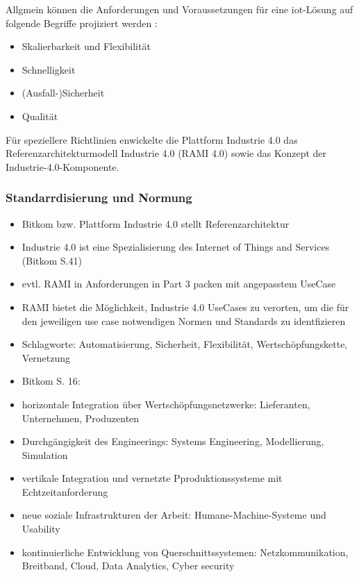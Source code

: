 Allgmein können die Anforderungen und Voraussetzungen für eine \ac{iot}-Lösung auf folgende Begriffe projiziert werden \citep{Acharya2019}:

\begin{itemize}
  \item Skalierbarkeit und Flexibilität
  \item Schnelligkeit
  \item (Ausfall-)Sicherheit
  \item Qualität
\end{itemize}

Für speziellere Richtlinien enwickelte die Plattform Industrie 4.0 das \glqq Referenzarchitekturmodell Industrie 4.0\grqq{} (RAMI 4.0) sowie das Konzept der \glqq Industrie-4.0-Komponente\grqq{}.

\subsubsection{Standarrdisierung und Normung}

\begin{itemize}
  \item Bitkom bzw. Plattform Industrie 4.0 stellt Referenzarchitektur
  \item Industrie 4.0 ist eine Spezialisierung des Internet of Things and Services (Bitkom S.41)
  \item evtl. RAMI in Anforderungen in Part 3 packen mit angepasstem UseCase
  \item RAMI bietet die Möglichkeit, Industrie 4.0 UseCases zu verorten, um die für den jeweiligen use case notwendigen Normen und Standards zu identfizieren
  \item Schlagworte: Automatisierung, Sicherheit, Flexibilität, Wertschöpfungskette, Vernetzung
  \item Bitkom S. 16:
  \item horizontale Integration über Wertschöpfungsnetzwerke: Lieferanten, Unternehmen, Produzenten
  \item Durchgängigkeit des Engineerings: Systems Engineering, Modellierung, Simulation
  \item vertikale Integration und vernetzte Pproduktionssysteme mit Echtzeitanforderung
  \item neue soziale Infrastrukturen der Arbeit: Humane-Machine-Systeme und Usability
  \item kontinuierliche Entwicklung von Querschnittssystemen: Netzkommunikation, Breitband, Cloud, Data Analytics, Cyber security
\end{itemize}

